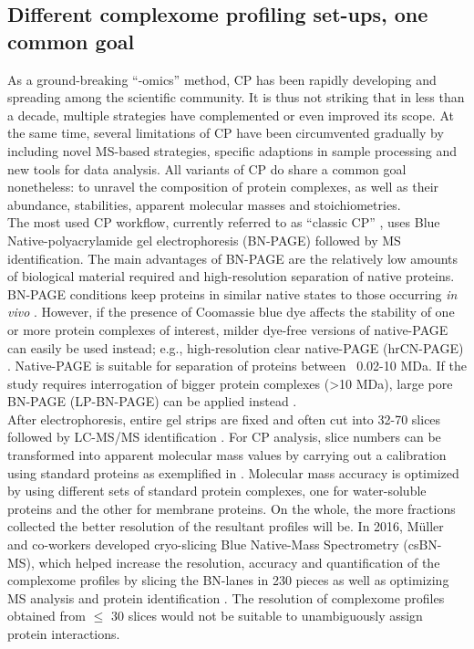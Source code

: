 \subsection{Different complexome profiling set-ups, one common goal}\label{ssec:CP_MS_ssec1}
As a ground-breaking “-omics” method, CP has been rapidly developing and spreading among the scientific community. It is thus not striking that in less than a decade, multiple strategies have complemented or even improved its scope. At the same time, several limitations of CP have been circumvented gradually by including novel MS-based strategies, specific adaptions in sample processing and new tools for data analysis. All variants of CP do share a common goal nonetheless: to unravel the composition of protein complexes, as well as their abundance, stabilities, apparent molecular masses and stoichiometries.\\
The most used CP workflow, currently referred to as “classic CP” \cite{Wittig_2021}, uses Blue Native-polyacrylamide gel electrophoresis (BN-PAGE) followed by MS identification. The main advantages of BN-PAGE are the relatively low amounts of biological material required and high-resolution separation of native proteins. BN-PAGE conditions keep proteins in similar native states to those occurring \emph{in vivo} \cite{Wittig_2006}. However, if the presence of Coomassie blue dye affects the stability of one or more protein complexes of interest, milder dye-free versions of native-PAGE can easily be used instead; e.g., high-resolution clear native-PAGE (hrCN-PAGE) \cite{Ladig_2011, Wittig_2007}. Native-PAGE is suitable for separation of proteins between ~0.02-10 MDa. If the study requires interrogation of bigger protein complexes (>10 MDa), large pore BN-PAGE (LP-BN-PAGE) can be applied instead \cite{Heide_2012, Strecker_2010}.\\
After electrophoresis, entire gel strips are fixed and often cut into 32-70 slices followed by LC-MS/MS identification \cite{Giese_2021, Heide_2012, Senkler_2017, Vidoni_2017}. For CP analysis, slice numbers can be transformed into apparent molecular mass values by carrying out a calibration using standard proteins as exemplified in \cite{Heide_2012, Wittig_2010}. Molecular mass accuracy is optimized by using different sets of standard protein complexes, one for water-soluble proteins and the other for membrane proteins. On the whole, the more fractions collected the better resolution of the resultant profiles will be. In 2016, Müller and co-workers developed cryo-slicing Blue Native-Mass Spectrometry (csBN-MS), which helped increase the resolution, accuracy and quantification of the complexome profiles by slicing the BN-lanes in 230 pieces as well as optimizing MS analysis and protein identification \cite{Muller_2016}. The resolution of complexome profiles obtained from \(\leq\) 30 slices would not be suitable to unambiguously assign protein interactions.\\
